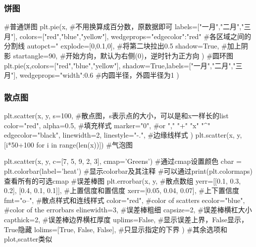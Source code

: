     \subsubsection{饼图}
      \begin{codeblock}[language=python, caption={pie chart}]
        #普通饼图
        plt.pie(x, #不用换算成百分数，原数据即可
                labels=["一月","二月","三月"],
                colors=["red","blue","yellow"],
                wedgeprops={"edgecolor":"red"} #各区域之间的分割线
                autopct="%
                explode=[0,0.1,0], #将第二块拉出0.5
                shadow=True, #加上阴影
                startangle=90, #开始方向，默认为右侧(0)，逆时针为正方向
        ) 
        #圆环图
        plt.pie(x,colors=["red","blue","yellow"],
                shadow=True,labels=["一月","二月","三月"],
                wedgeprops={"width":0.6} #内圆半径，外圆半径为1
        ) 
      \end{codeblock}

    \subsubsection{散点图}
      \begin{codeblock}[language=python, caption={scatter plot}]
        plt.scatter(x, y, s=100, #散点图，s表示点的大小，可以是和x一样长的list
                    color="red", alpha=0.5, #填充样式
                    marker="0", #or "," "+" "x" "\^{}"
                    edgecolor="black", linewidth=2, linestyle="-.", #边缘线样式
        ) 
        plt.scatter(x, y, [i*50+100 for i in range(len(x))]) #气泡图

        plt.scatter(x, y, c=[7, 5, 9, 2, 3], cmap='Greens') #通过cmap设置颜色
        cbar = plt.colorbar(label='heat') #显示colorbar及其注释
        #可以通过print(plt.colormaps)查看所有的可选cmap
        #误差棒图
        plt.errorbar(x, y, #散点数组
                    yerr=[[0.1, 0.3, 0.2], [0.4, 0.1, 0.1]], #上置信度和置信度
                    xerr=[0.05, 0.04, 0.07], #上下置信度
                    fmt="o--", #散点样式和连线样式
                    color="red", #color of scatters
                    ecolor="blue", #color of the errorbars
                    elinewidth=3, #误差棒粗细
                    capsize=2, #误差棒横杠大小
                    capthick=2, #误差棒边界横杠厚度
                    uplims=False, #显示误差上界，False显示，True隐藏
                    lolims=[True, False, False], #只显示指定的下界
        ) #其余选项和plot,scatter类似
      \end{codeblock}

